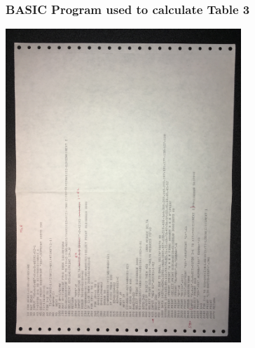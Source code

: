 \begin{frame}
    \frametitle{BASIC Program used to calculate Table 3}
    \begin{center}
        \includegraphics[width=3.5in,angle=180]{Photos/mle-bas-5036.jpg}        
    \end{center}  
\end{frame}
